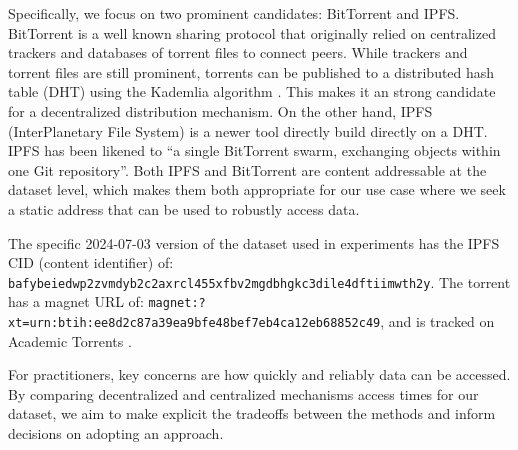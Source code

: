 \documentclass{article}
\begin{document}
Specifically, we focus on two prominent candidates:
BitTorrent and IPFS.
BitTorrent \cite{cohen_incentives_2003, cohen_bittorrent_2017} is a well known sharing protocol that
  originally relied on centralized trackers and databases of torrent files to connect peers.
While trackers and torrent files are still prominent, torrents can be published to a distributed hash table
  (DHT) using the Kademlia algorithm \cite{maymounkov_kademlia_2002}.
This makes it an strong candidate for a decentralized distribution mechanism.
On the other hand, IPFS (InterPlanetary File System) \cite{benet_ipfs_2014, bieri_overview_2021} is a newer
  tool directly build directly on a DHT.
IPFS has been likened to ``a single BitTorrent swarm, exchanging objects within one Git repository''.
Both IPFS and BitTorrent are content addressable at the dataset level, which makes them both appropriate for
  our use case where we seek a static address that can be used to robustly access data.


The specific 2024-07-03 version of the dataset used in experiments has the IPFS CID (content identifier) of:
{\tt bafybeiedwp2zvmdyb2c2axrcl455xfbv2mgdbhgkc3dile4dftiimwth2y}.
The torrent has a magnet URL of:
{\tt magnet:?xt=urn:btih:ee8d2c87a39ea9bfe48bef7eb4ca12eb68852c49}, and is 
tracked on Academic Torrents \cite{academic_torrents_Cohen2014}.

For practitioners, key concerns are how quickly and reliably data can be accessed.
By comparing decentralized and centralized mechanisms access times for our dataset, we aim to make
  explicit the tradeoffs between the methods and inform decisions on adopting an approach.

\end{document}
